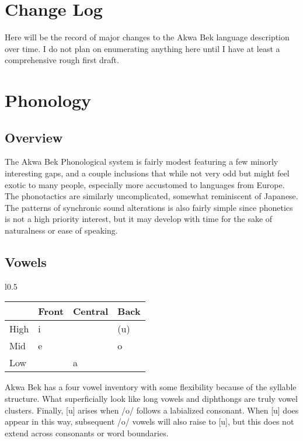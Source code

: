 \documentclass[11pt,letterpaper]{article}
\begin{document}
\section{Change Log}
  Here will be the record of major changes to the Akwa Bek language description over time. I do not plan on enumerating anything here until I have at least a comprehensive rough first draft.
\pagebreak


\section{Phonology}
\label{phonology}
  \subsection{Overview}
  The Akwa Bek Phonological system is fairly modest featuring a few minorly interesting gaps, and a couple inclusions that while not very odd but might feel exotic to many people, especially more accustomed to languages from Europe. The phonotactics are similarly uncomplicated, somewhat reminiscent of Japanese. The patterns of synchronic sound alterations is also fairly simple since phonetics is not a high priority interest, but it may develop with time for the sake of naturalness or ease of speaking.
\vspace{5mm}

  \subsection{Vowels}
  \label{vowels}
     \begin{wrapfigure}{l}{0.5\textwidth}
       \begin{tabular}{|l|l|l|l|}
         \hline
                 & Front      & Central    & Back         \\ \hline \hline
         High    & i          &            & (u)          \\
         Mid     & e          &            & o            \\
         Low     &            & a          &              \\ \hline
       \end{tabular}
     \end{wrapfigure}
     Akwa Bek has a four vowel inventory with some flexibility because of the syllable structure. What superficially look like long vowels and diphthongs are truly vowel clusters. Finally, [u] arises when /o/ follows a labialized consonant. When [u] does appear in this way, subsequent /o/ vowels will also raise to [u], but this does not extend across consonants or word boundaries.
  \par
\vspace{5mm}
\end{document}
